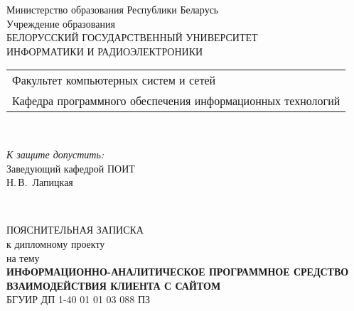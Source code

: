 \begin{titlepage}
  \begin{center}
    Министерство образования Республики Беларусь\\[1em]
    Учреждение образования\\
    БЕЛОРУССКИЙ ГОСУДАРСТВЕННЫЙ УНИВЕРСИТЕТ \\
    ИНФОРМАТИКИ И РАДИОЭЛЕКТРОНИКИ\\[1em]

    \begin{minipage}{\textwidth}
      \begin{flushleft}
        \begin{tabular}{ l }
          Факультет компьютерных систем и сетей\\
          Кафедра программного обеспечения информационных технологий
        \end{tabular}
      \end{flushleft}
    \end{minipage}\\[1em]

    \begin{flushright}
      \begin{minipage}{0.4\textwidth}
        \textit{К защите допустить:}\\[0.8em]
        Заведующий кафедрой ПОИТ\\[0.45em]
        \underline{\hspace*{2.8cm}} Н.\,В.~Лапицкая
      \end{minipage}\\[2.2em]
    \end{flushright}

    {ПОЯСНИТЕЛЬНАЯ ЗАПИСКА}\\
    {к дипломному проекту}\\
    {на тему}\\[1em]
    \textbf{\large ИНФОРМАЦИОННО-АНАЛИТИЧЕСКОЕ ПРОГРАММНОЕ СРЕДСТВО ВЗАИМОДЕЙСТВИЯ КЛИЕНТА С САЙТОМ}\\[1em]


    {БГУИР ДП 1-40 01 01 03 088 ПЗ}\\[2em]


\end{center}
\end{titlepage}

